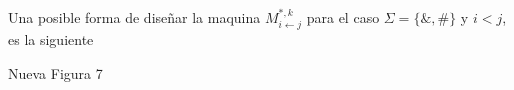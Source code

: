 \begin{frame}

  Una posible forma de dise\~{n}ar la maquina $M_{i\leftarrow j}^{\ast ,k}$
para el caso $\Sigma =\{\&,\#\}$ y $i<j$, es la siguiente

\bigskip

\bigskip

\bigskip

Nueva Figura 7

\end{frame}
